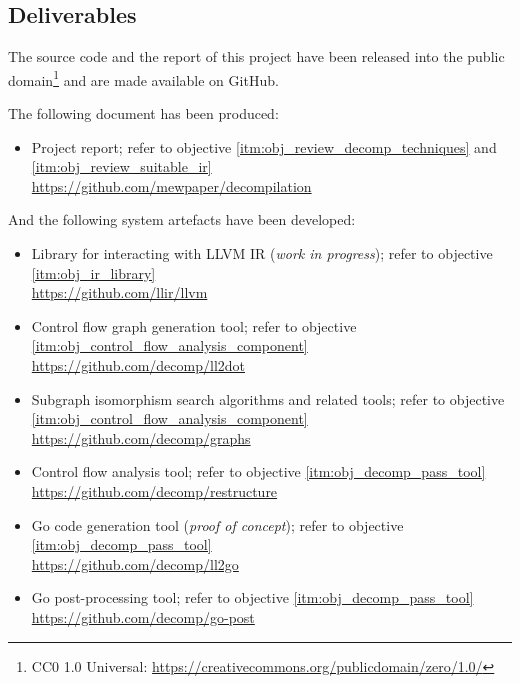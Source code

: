 
\subsection{Deliverables}
\label{sec:intro_deliverables}

The source code and the report of this project have been released into the public domain\footnote{CC0 1.0 Universal: \url{https://creativecommons.org/publicdomain/zero/1.0/}} and are made available on GitHub.

The following document has been produced:

\begin{itemize}
	\item Project report; refer to objective \ref{itm:obj_review_decomp_techniques} and \ref{itm:obj_review_suitable_ir} \\ \url{https://github.com/mewpaper/decompilation}
\end{itemize}

And the following system artefacts have been developed:

\begin{itemize}
	\item Library for interacting with LLVM IR (\textit{work in progress}); refer to objective \ref{itm:obj_ir_library} \\ \url{https://github.com/llir/llvm}
	\item Control flow graph generation tool; refer to objective \ref{itm:obj_control_flow_analysis_component} \\ \url{https://github.com/decomp/ll2dot}
	\item Subgraph isomorphism search algorithms and related tools; refer to objective \ref{itm:obj_control_flow_analysis_component} \\ \url{https://github.com/decomp/graphs}
	\item Control flow analysis tool; refer to objective \ref{itm:obj_decomp_pass_tool} \\ \url{https://github.com/decomp/restructure}
	\item Go code generation tool (\textit{proof of concept}); refer to objective \ref{itm:obj_decomp_pass_tool} \\ \url{https://github.com/decomp/ll2go}
	\item Go post-processing tool; refer to objective \ref{itm:obj_decomp_pass_tool} \\ \url{https://github.com/decomp/go-post}
\end{itemize}

